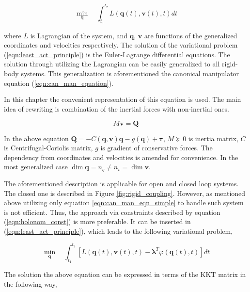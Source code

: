 \begin{equation}
    \min_{\mathbf{q}} \quad 
    \int_{t_1}^{t_2} L(\mathbf{q}(t), \mathbf{v}(t), t) dt
    \label{eqn:least_act_principle}
\end{equation}

where $L$ is Lagrangian of the system, and $\mathbf{q}$, $\mathbf{v}$ are 
functions of the generalized coordinates and velocities respectively. The solution 
of the variational problem (\ref{eqn:least_act_principle}) is the Euler-Lagrange 
differential equations. The solution through utilizing the Lagrangian can be 
easily generalized to all rigid-body systems. This generalization is aforementioned 
the canonical manipulator equation (\ref{eqn:can_man_equation}). 

In this chapter the convenient representation of this equation is used. The main 
idea of rewriting is combination of the inertial forces with non-inertial ones.

\begin{equation}
    M \dot{\mathbf{v}} = \mathbf{Q}
    \label{eqn:can_man_eqn_simple}
\end{equation}

In the above equation $\mathbf{Q} = 
-C(\mathbf{q}, \mathbf{v}) \dot{\mathbf{q}} - g(\mathbf{q}) + 
\boldsymbol{\tau}$, $M \succcurlyeq 0$ is inertia matrix, $C$ is Centrifugal-Coriolis 
matrix, $g$ is gradient of conservative forces. The dependency from coordinates and 
velocities is amended for convenience. In the most generalized case 
$\dim{\mathbf{q}} = n_q \neq n_v = \dim{\mathbf{v}}$.

The aforementioned description is applicable for open and closed loop systems. 
The closed one is described in Figure \ref{fig:rigid_coupling}. However, 
as mentioned above utilizing only equation \ref{eqn:can_man_eqn_simple} to handle 
such system is not efficient. Thus, the approach via constraints described
by equation (\ref{eqn:holonom_const}) is more preferable. It can be inserted in 
(\ref{eqn:least_act_principle}), which leads to the following variational problem, 

\begin{equation}
    \min_{\mathbf{q}} \quad 
    \int_{t_1}^{t_2} [L(\mathbf{q}(t), \mathbf{v}(t), t) - 
    \pmb{\lambda}^T \varphi(\mathbf{q}(t), t)]dt
    \label{eqn:least_act_principle_const}
\end{equation}

The solution the above equation can be expressed in terms of the KKT matrix in 
the following way, 

